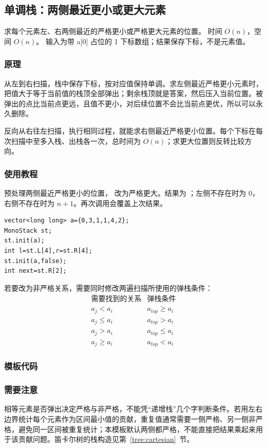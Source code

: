 \subsection{单调栈：两侧最近更小或更大元素}
\label{ds:monotonic-stack}
\AlgorithmInfo
    {求每个元素左、右两侧最近的严格更小或严格更大元素的位置。}
    {时间 $O(n)$，空间 $O(n)$。}
    {输入为带 a[0] 占位的 1 下标数组；结果保存下标，不是元素值。}
\subsubsection*{原理}
从左到右扫描，栈中保存下标，按对应值保持单调。求左侧最近严格更小元素时，把值大于等于当前值的栈顶全部弹出；剩余栈顶就是答案，然后压入当前位置。被弹出的点比当前点更远，且值不更小，对后续位置不会比当前点更优，所以可以永久删除。

反向从右往左扫描，执行相同过程，就能求右侧最近严格更小位置。每个下标在每次扫描中至多入栈、出栈各一次，总时间为 $O(n)$；求更大位置则反转比较方向。
\subsubsection*{使用教程}
 预处理两侧最近严格更小的位置， 改为严格更大。结果为 ；左侧不存在时为 0，右侧不存在时为 $n+1$。再次调用会覆盖上次结果。
\begin{lstlisting}[style=mtycpp,numbers=none]
vector<long long> a={0,3,1,1,4,2};
MonoStack st;
st.init(a);
int l=st.L[4],r=st.R[4];
st.init(a,false);
int next=st.R[2];
\end{lstlisting}
若要改为非严格关系，需要同时修改两遍扫描所使用的弹栈条件：
\[
\begin{array}{c|c}
\text{需要找到的关系}&\text{弹栈条件}\\ \hline
a_j<a_i&a_{top}\ge a_i\\
a_j\le a_i&a_{top}>a_i\\
a_j>a_i&a_{top}\le a_i\\
a_j\ge a_i&a_{top}<a_i
\end{array}
\]
\subsubsection*{模板代码}
\subsubsection*{需要注意}
相等元素是否弹出决定严格与非严格，不能凭“递增栈”几个字判断条件。若用左右边界统计每个元素作为区间最小值的贡献，重复值通常需要一侧严格、另一侧非严格，避免同一区间被重复统计；本模板默认两侧都严格，不能直接把结果乘起来用于该贡献问题。笛卡尔树的栈构造见第~\ref{tree:cartesian}~节。
